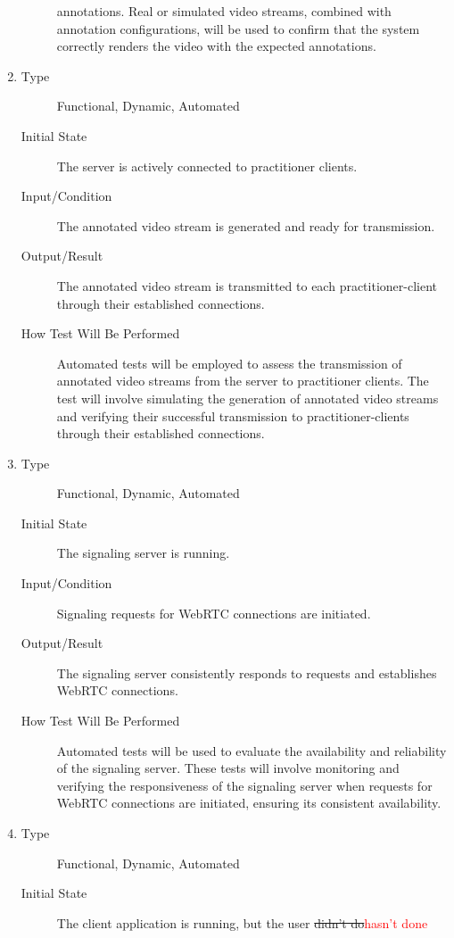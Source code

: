 \documentclass[12pt, titlepage]{article}
\newcommand{\rt}[1]{\textcolor{red}{#1}}
\begin{document}
\begin{enumerate}[FR-T1]
\begin{description}
    annotations. Real or simulated video streams, combined with annotation
    configurations, will be used to confirm that the system correctly renders
    the video with the expected annotations.
  \end{description}
\item \label{FRT10}
  \begin{description}
  \item[Type] Functional, Dynamic, Automated
  \item[Initial State] The server is actively connected to practitioner clients.
  \item[Input/Condition] The annotated video stream is generated and ready for
    transmission.
  \item[Output/Result] The annotated video stream is transmitted to each
    practitioner-client through their established connections.
  \item[How Test Will Be Performed] Automated tests will be employed to assess
    the transmission of annotated video streams from the server to practitioner
    clients. The test will involve simulating the generation of annotated video
    streams and verifying their successful transmission to practitioner-clients
    through their established connections.
  \end{description}
\item \label{FRT11}
  \begin{description}
  \item[Type] Functional, Dynamic, Automated
  \item[Initial State] The signaling server is running.
  \item[Input/Condition] Signaling requests for WebRTC connections are initiated.
  \item[Output/Result] The signaling server consistently responds to requests and
    establishes WebRTC connections.
  \item[How Test Will Be Performed] Automated tests will be used to evaluate the
    availability and reliability of the signaling server. These tests will
    involve monitoring and verifying the responsiveness of the signaling server
    when requests for WebRTC connections are initiated, ensuring its consistent
    availability.
  \end{description}
\item \label{FRT12}
  \begin{description}
  \item[Type] Functional, Dynamic, Automated
  \item[Initial State] The client application is running, but the user \sout{didn’t do}\rt{hasn’t done}

\end{description}
\end{enumerate}
\end{document}
